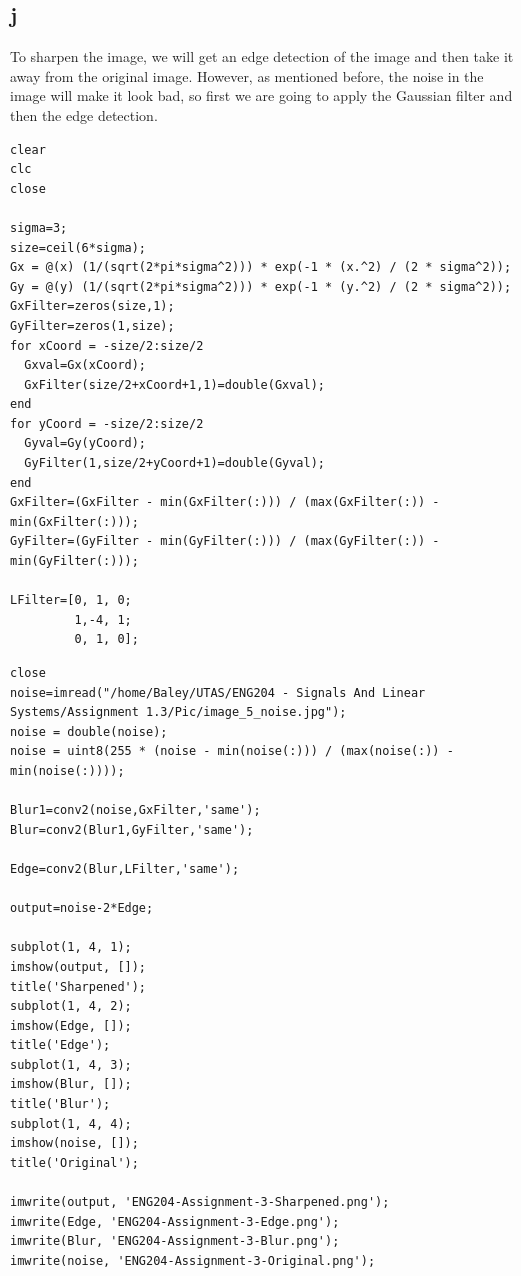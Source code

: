 \documentclass[11pt]{article}
\begin{document}
\subsection{j}
\label{sec:org416e70f}
To sharpen the image, we will get an edge detection of the image and then take it away from the original image. However, as mentioned before, the noise in the image will make it look bad, so first we are going to apply the Gaussian filter and then the edge detection.
\begin{verbatim}
clear
clc
close

sigma=3;
size=ceil(6*sigma);
Gx = @(x) (1/(sqrt(2*pi*sigma^2))) * exp(-1 * (x.^2) / (2 * sigma^2));
Gy = @(y) (1/(sqrt(2*pi*sigma^2))) * exp(-1 * (y.^2) / (2 * sigma^2));
GxFilter=zeros(size,1);
GyFilter=zeros(1,size);
for xCoord = -size/2:size/2
  Gxval=Gx(xCoord);
  GxFilter(size/2+xCoord+1,1)=double(Gxval);
end
for yCoord = -size/2:size/2
  Gyval=Gy(yCoord);
  GyFilter(1,size/2+yCoord+1)=double(Gyval);
end
GxFilter=(GxFilter - min(GxFilter(:))) / (max(GxFilter(:)) - min(GxFilter(:)));
GyFilter=(GyFilter - min(GyFilter(:))) / (max(GyFilter(:)) - min(GyFilter(:)));

LFilter=[0, 1, 0;
         1,-4, 1;
         0, 1, 0];
\end{verbatim}


\begin{verbatim}
close
noise=imread("/home/Baley/UTAS/ENG204 - Signals And Linear Systems/Assignment 1.3/Pic/image_5_noise.jpg");
noise = double(noise);
noise = uint8(255 * (noise - min(noise(:))) / (max(noise(:)) - min(noise(:))));

Blur1=conv2(noise,GxFilter,'same');
Blur=conv2(Blur1,GyFilter,'same');

Edge=conv2(Blur,LFilter,'same');

output=noise-2*Edge;

subplot(1, 4, 1);
imshow(output, []);
title('Sharpened');
subplot(1, 4, 2);
imshow(Edge, []);
title('Edge');
subplot(1, 4, 3);
imshow(Blur, []);
title('Blur');
subplot(1, 4, 4);
imshow(noise, []);
title('Original');

imwrite(output, 'ENG204-Assignment-3-Sharpened.png');
imwrite(Edge, 'ENG204-Assignment-3-Edge.png');
imwrite(Blur, 'ENG204-Assignment-3-Blur.png');
imwrite(noise, 'ENG204-Assignment-3-Original.png');

\end{verbatim}
\end{document}
